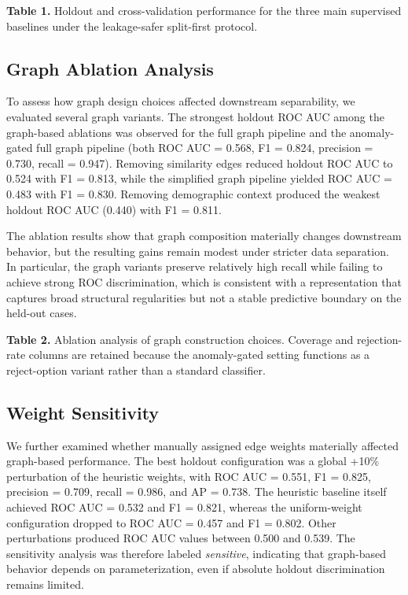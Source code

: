\documentclass[pdflatex,sn-basic]{sn-jnl}%
\theoremstyle{thmstyleone}%
\theoremstyle{thmstyletwo}%
\theoremstyle{thmstylethree}%
\begin{document}
\noindent\textbf{Table 1.} Holdout and cross-validation performance for the three main supervised baselines under the leakage-safer split-first protocol.
\begin{center}
\scriptsize

\end{center}

\subsection{Graph Ablation Analysis}

To assess how graph design choices affected downstream separability, we evaluated several graph variants. The strongest holdout ROC AUC among the graph-based ablations was observed for the full graph pipeline and the anomaly-gated full graph pipeline (both ROC AUC = 0.568, F1 = 0.824, precision = 0.730, recall = 0.947). Removing similarity edges reduced holdout ROC AUC to 0.524 with F1 = 0.813, while the simplified graph pipeline yielded ROC AUC = 0.483 with F1 = 0.830. Removing demographic context produced the weakest holdout ROC AUC (0.440) with F1 = 0.811. 

The ablation results show that graph composition materially changes downstream behavior, but the resulting gains remain modest under stricter data separation. In particular, the graph variants preserve relatively high recall while failing to achieve strong ROC discrimination, which is consistent with a representation that captures broad structural regularities but not a stable predictive boundary on the held-out cases.

\noindent\textbf{Table 2.} Ablation analysis of graph construction choices. Coverage and rejection-rate columns are retained because the anomaly-gated setting functions as a reject-option variant rather than a standard classifier.
\begin{center}
\scriptsize

\end{center}

\subsection{Weight Sensitivity}

We further examined whether manually assigned edge weights materially affected graph-based performance. The best holdout configuration was a global +10\% perturbation of the heuristic weights, with ROC AUC = 0.551, F1 = 0.825, precision = 0.709, recall = 0.986, and AP = 0.738. The heuristic baseline itself achieved ROC AUC = 0.532 and F1 = 0.821, whereas the uniform-weight configuration dropped to ROC AUC = 0.457 and F1 = 0.802. Other perturbations produced ROC AUC values between 0.500 and 0.539. The sensitivity analysis was therefore labeled \textit{sensitive}, indicating that graph-based behavior depends on parameterization, even if absolute holdout discrimination remains limited.
\end{document}
